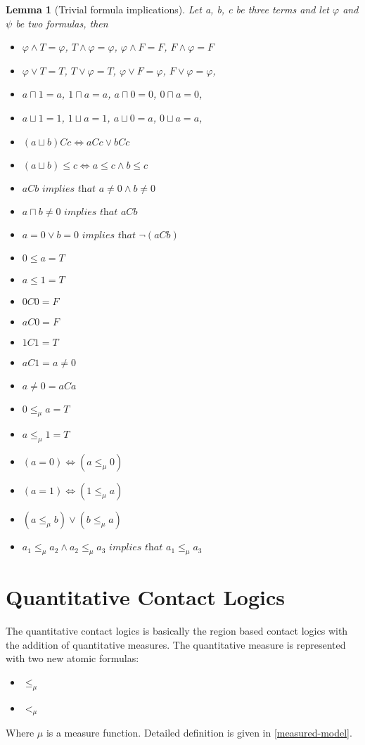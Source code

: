 \documentclass{article}
\newtheorem{lemma}[theorem]{Lemma}
\begin{document}
\begin{lemma}[Trivial formula implications]
	Let a, b, c be three terms and let $\varphi$ and $\psi$ be two formulas, then
	\begin{itemize}
		\item $\varphi \land T = \varphi$,\;\; $T \land \varphi = \varphi$,\;\;
		      $\varphi \land F = F$,\;\; $F \land \varphi = F$
		\item $\varphi \lor T = T$,\;\; $T \lor \varphi = T$,\;\;
		      $\varphi \lor F = \varphi$,\;\; $F \lor \varphi = \varphi$,
		\item $a \sqcap 1 = a$,\;\; $1 \sqcap a = a$,\;\;
		      $a \sqcap 0 = 0$,\;\; $0 \sqcap a = 0$,
		\item $a \sqcup 1 = 1$,\;\; $1 \sqcup a = 1$,\;\;
		      $a \sqcup 0 = a$,\;\; $0 \sqcup a = a$,
		\item $(a \sqcup b)Cc \iff aCc \lor bCc$
		\item $(a \sqcup b) \leq c \iff a \leq c \land b \leq c$
		\item $aCb \textit{ implies that } a \neq 0 \land b \neq 0$
		\item $a \sqcap b \neq 0 \textit{ implies that } aCb$
		\item $a = 0 \lor b = 0 \textit{ implies that } \neg(aCb)$
		\item $0 \leq a = T$
		\item $a \leq 1 = T$
		\item $0C0 = F$
		\item $aC0 = F$
		\item $1C1 = T$
		\item $aC1 = a \neq 0$
		\item $a \neq 0 = aCa$
		\item $0 \le_\mu a = T$
		\item $a \le_\mu 1 = T$
		\item $(a = 0) \iff (a \le_\mu 0)$
		\item $(a = 1) \iff (1 \le_\mu a)$
		\item $(a \le_\mu b) \lor (b \le_\mu a)$
		\item $a_1 \le_\mu a_2 \land a_2 \le_\mu a_3 \textit{ implies that } a_1 \le_\mu a_3$

	\end{itemize}
\end{lemma}

	\newpage
	\section{Quantitative Contact Logics}
		The quantitative contact logics is basically the region based contact logics with the addition of quantitative measures. The quantitative measure is represented 
		with two new atomic formulas:
		\begin{itemize} 
			\item $\le_\mu$
			\item $<_\mu$
		\end{itemize}
		Where $\mu$ is a measure function. Detailed definition is given in \ref{measured-model}.
	
\end{document}
